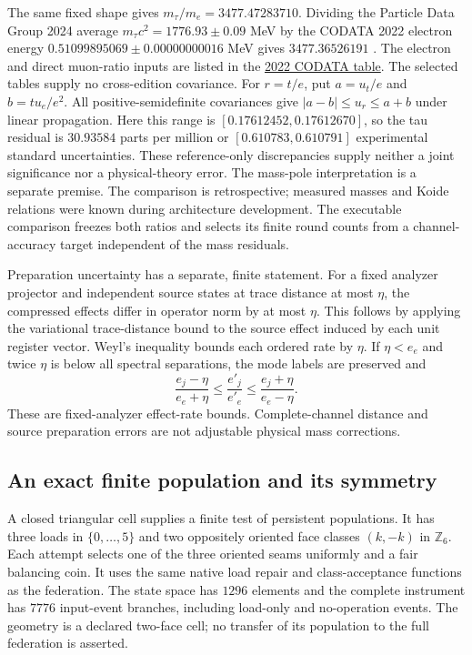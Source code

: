 The same fixed shape gives $m_\tau/m_e=3477.47283710$. Dividing the
Particle Data Group 2024 average $m_\tau c^2=1776.93\pm0.09$ MeV by the
CODATA 2022 electron energy $0.51099895069\pm0.00000000016$ MeV gives
$3477.36526191$ \cite{pwnavas2024review}. The electron and direct muon-ratio
inputs are listed in the \href{https://physics.nist.gov/cuu/Constants/Table/allascii.txt}{2022 CODATA table}.
The selected tables supply no cross-edition covariance. For $r=t/e$, put
$a=u_t/e$ and $b=t u_e/e^2$. All positive-semidefinite covariances give
$|a-b|\le u_r\le a+b$ under linear propagation. Here this range is
$[0.17612452,0.17612670]$, so the tau residual is $30.93584$ parts per
million or $[0.610783,0.610791]$ experimental standard uncertainties.
These reference-only discrepancies supply neither a joint significance nor
a physical-theory error. The mass-pole interpretation is a separate premise.
The comparison is retrospective; measured masses and Koide relations were
known during architecture development. The executable comparison freezes
both ratios and selects its finite round counts from a channel-accuracy
target independent of the mass residuals.

Preparation uncertainty has a separate, finite statement. For a fixed
analyzer projector and independent source states at trace distance at most
$\eta$, the compressed effects differ in operator norm by at most $\eta$.
This follows by applying the variational trace-distance bound to the source
effect induced by each unit register vector. Weyl's inequality bounds each
ordered rate by $\eta$. If $\eta<e_e$ and twice $\eta$ is below all spectral
separations, the mode labels are preserved and
\[
 \frac{e_j-\eta}{e_e+\eta}\le\frac{e'_j}{e'_e}
 \le\frac{e_j+\eta}{e_e-\eta}.
\]
These are fixed-analyzer effect-rate bounds. Complete-channel distance and
source preparation errors are not adjustable physical mass corrections.

\subsection{An exact finite population and its symmetry}
\label{sec:finite-population-dynamics}

A closed triangular cell supplies a finite test of persistent populations.
It has three loads in $\{0,\ldots,5\}$ and two oppositely oriented face
classes $(k,-k)$ in $\mathbb Z_6$. Each attempt selects one of the three
oriented seams uniformly and a fair balancing coin. It uses the same native
load repair and class-acceptance functions as the federation. The state space
has $1296$ elements and the complete instrument has $7776$ input-event
branches, including load-only and no-operation events. The geometry is a
declared two-face cell; no transfer of its population to the full federation
is asserted.

